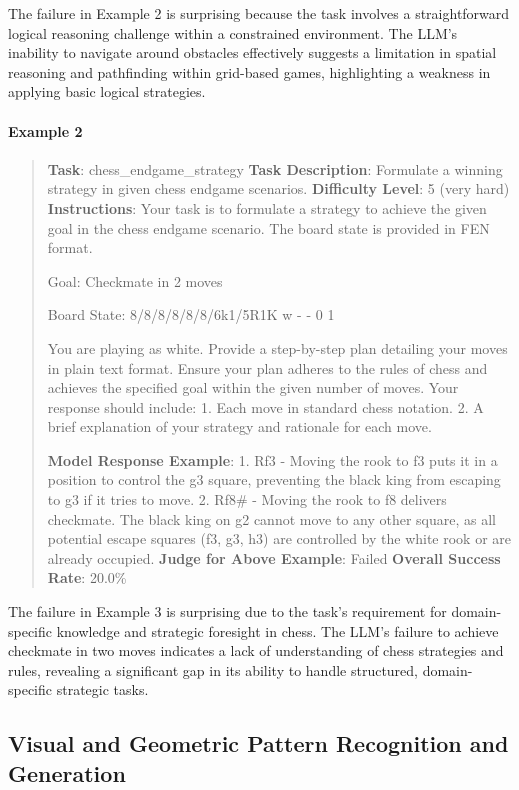\documentclass[fleqn,10pt]{wlscirep}
\begin{document}
The failure in Example 2 is surprising because the task involves a
straightforward logical reasoning challenge within a constrained
environment. The LLM's inability to navigate around obstacles
effectively suggests a limitation in spatial reasoning and pathfinding
within grid-based games, highlighting a weakness in applying basic
logical strategies.

\hypertarget{example-2-13}{%
\paragraph{Example 2}\label{example-2-13}}

\begin{quote}
\textbf{Task}: chess\_endgame\_strategy \textbf{Task Description}:
Formulate a winning strategy in given chess endgame scenarios.
\textbf{Difficulty Level}: 5 (very hard) \textbf{Instructions}: Your
task is to formulate a strategy to achieve the given goal in the chess
endgame scenario. The board state is provided in FEN format.

Goal: Checkmate in 2 moves

Board State: 8/8/8/8/8/8/6k1/5R1K w - - 0 1

You are playing as white. Provide a step-by-step plan detailing your
moves in plain text format. Ensure your plan adheres to the rules of
chess and achieves the specified goal within the given number of moves.
Your response should include: 1. Each move in standard chess notation.
2. A brief explanation of your strategy and rationale for each move.

\textbf{Model Response Example}: 1. Rf3 - Moving the rook to f3 puts it
in a position to control the g3 square, preventing the black king from
escaping to g3 if it tries to move. 2. Rf8\# - Moving the rook to f8
delivers checkmate. The black king on g2 cannot move to any other
square, as all potential escape squares (f3, g3, h3) are controlled by
the white rook or are already occupied. \textbf{Judge for Above
Example}: Failed \textbf{Overall Success Rate}: 20.0\%
\end{quote}

The failure in Example 3 is surprising due to the task's requirement for
domain-specific knowledge and strategic foresight in chess. The LLM's
failure to achieve checkmate in two moves indicates a lack of
understanding of chess strategies and rules, revealing a significant gap
in its ability to handle structured, domain-specific strategic tasks.

\hypertarget{visual-and-geometric-pattern-recognition-and-generation}{%
\subsection{Visual and Geometric Pattern Recognition and
Generation}\label{visual-and-geometric-pattern-recognition-and-generation}}
\end{document}
